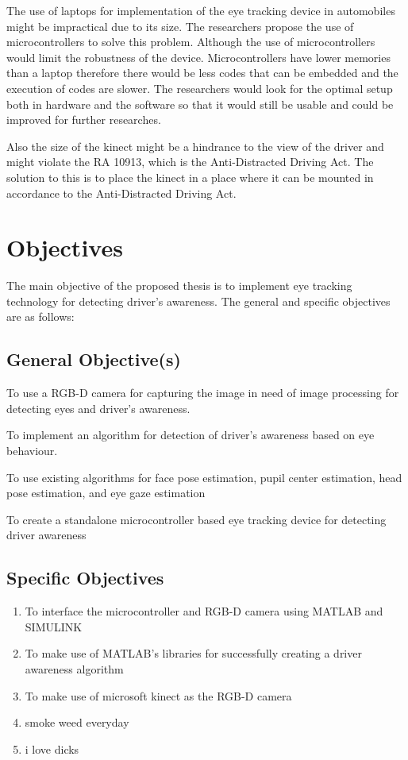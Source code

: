 The use of laptops for implementation of the eye tracking device in automobiles might be impractical due to its size. The researchers propose the use of microcontrollers to solve this problem. Although the use of microcontrollers would limit the robustness of the device. Microcontrollers have lower memories than a laptop therefore there would be less codes that can be embedded and the execution of codes are slower. The researchers would look for the optimal setup both in hardware and the software so that it would still be usable and could be improved for further researches.

Also the size of the kinect might be a hindrance to the view of the driver and might violate the RA 10913, which is the Anti-Distracted Driving Act. The solution to this is to place the kinect in a place where it can be mounted in accordance to the Anti-Distracted Driving Act.


\section{Objectives}

The main objective of the proposed thesis is to implement eye tracking technology for detecting driver’s awareness. The general and specific objectives are as follows:

\subsection{General Objective(s)}
To use a RGB-D camera for capturing the image in need of image processing for detecting eyes and driver’s awareness.

To implement an algorithm for detection of driver’s awareness based on eye behaviour.

To use existing algorithms for face pose estimation, pupil center estimation, head pose estimation, and eye gaze estimation

To create a standalone microcontroller based eye tracking device for detecting driver awareness


\subsection{Specific Objectives}

\begin{enumerate}
	
	\item To interface the microcontroller and RGB-D camera using MATLAB and SIMULINK
	
	\item To make use of MATLAB’s libraries for successfully creating a driver awareness algorithm 
	
	\item To make use of microsoft kinect as the RGB-D camera
	
	\item smoke weed everyday
	
	\item i love dicks
	
\end{enumerate}



